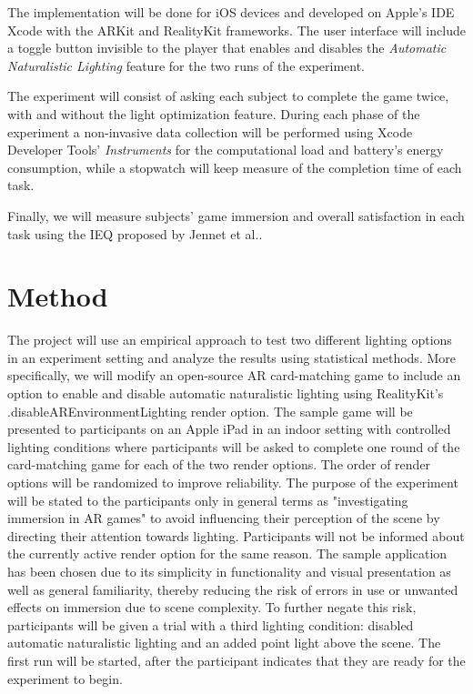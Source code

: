 \documentclass[12pt,twoside,english]{article}
\begin{document}
The implementation will be done for iOS devices and developed on Apple's IDE Xcode with the ARKit and RealityKit frameworks.
The user interface will include a toggle button invisible to the player that enables and disables the \emph{Automatic Naturalistic Lighting} feature for the two runs of the experiment.

The experiment will consist of asking each subject to complete the game twice, with and without the light optimization feature.
During each phase of the experiment a non-invasive data collection will be performed using Xcode Developer Tools' \emph{Instruments} for the computational load and battery's energy consumption, while a stopwatch will keep measure of the completion time of each task.

Finally, we will measure subjects' game immersion and overall satisfaction in each task using the \gls{IEQ} proposed by Jennet et al.\cite{jennett_measuring_2008}.

\section{Method}
\label{sect:method}

The project will use an empirical approach to test two different lighting options in an experiment setting and analyze the results using statistical methods.
More specifically, we will modify an open-source \gls{AR} card-matching game \cite{cobb_maxxfrazerrealitykit-cardflip_2020} to include an option to enable and disable automatic naturalistic lighting using RealityKit's \textsf{.disableAREnvironmentLighting} render option.
The sample game will be presented to participants on an Apple iPad in an indoor setting with controlled lighting conditions where participants will be asked to complete one round of the card-matching game for each of the two render options.
The order of render options will be randomized to improve reliability.
The purpose of the experiment will be stated to the participants only in general terms as "investigating immersion in \gls{AR} games" to avoid influencing their perception of the scene by directing their attention towards lighting.
Participants will not be informed about the currently active render option for the same reason.
The sample application has been chosen due to its simplicity in functionality and visual presentation as well as general familiarity, thereby reducing the risk of errors in use or unwanted effects on immersion due to scene complexity.
To further negate this risk, participants will be given a trial with a third lighting condition: disabled automatic naturalistic lighting and an added point light above the scene.
The first run will be started, after the participant indicates that they are ready for the experiment to begin.
\end{document}
